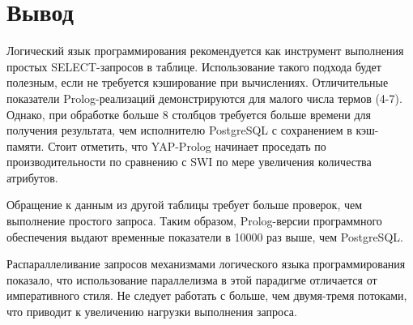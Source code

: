 \section*{Вывод}
\vspace{-0.5cm}
Логический язык программирования рекомендуется как инструмент выполнения простых SELECT-запросов в таблице. Использование такого подхода будет полезным, если не требуется кэширование при вычислениях. Отличительные показатели Prolog-реализаций демонстрируются для малого числа термов (4-7). Однако, при обработке больше 8 столбцов требуется больше времени для получения результата, чем исполнителю PostgreSQL с сохранением в кэш-памяти. Стоит отметить, что YAP-Prolog начинает проседать по производительности по сравнению с SWI по мере увеличения количества атрибутов.

Обращение к данным из другой таблицы требует больше проверок, чем выполнение простого запроса. Таким образом, Prolog-версии программного обеспечения выдают временные показатели в 10000 раз выше, чем PostgreSQL.

Распараллеливание запросов механизмами логического языка программирования показало, что использование параллелизма в этой парадигме отличается от императивного стиля. Не следует работать с больше, чем двумя-тремя потоками, что приводит к увеличению нагрузки выполнения запроса.